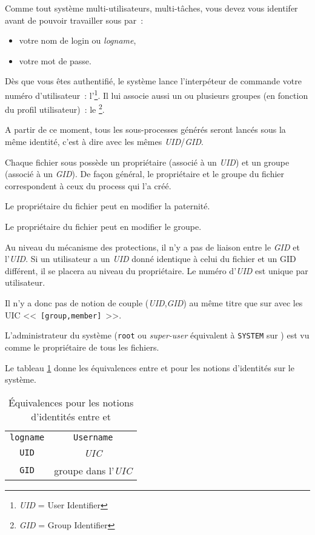 Comme tout syst{\`e}me multi-utilisateurs, multi-t{\^a}ches, vous devez vous
identifer avant de pouvoir travailler sous {\Unix} par~:
\begin{itemize}
	\item	votre nom de login ou {\sl logname},
	\item	votre mot de passe.
\end{itemize}

D{\`e}s que vous {\^e}tes authentifi{\'e}, le syst{\`e}me lance
l'interp{\'e}teur de commande votre num{\'e}ro d'utilisateur~:
l'\footnote{{\sl UID} = User Identifier}. Il lui
associe aussi un ou plusieurs groupes (en fonction du profil
utilisateur)~: le \footnote{{\sl GID} = Group Identifier}.

A partir de ce moment, tous les sous-processes g{\'e}n{\'e}r{\'e}s seront lanc{\'e}s
sous la m{\^e}me identit{\'e}, c'est {\`a} dire avec les m{\^e}mes {\sl UID}/{\sl GID}.

Chaque fichier sous {\Unix} poss{\`e}de un propri{\'e}taire (associ{\'e} {\`a} un
{\sl UID}) et un groupe (associ{\'e} {\`a} un {\sl GID}). De fa\c{c}on g{\'e}n{\'e}ral, le
propri{\'e}taire et le groupe du fichier correspondent {\`a} ceux du process qui
l'a cr{\'e}{\'e}.

Le propri{\'e}taire du fichier peut en modifier la paternit{\'e}.

Le propri{\'e}taire du fichier peut en modifier le groupe.

Au niveau du m{\'e}canisme des protections, il n'y a pas de liaison entre le
{\sl GID} et l'{\sl UID}. Si un utilisateur a un {\sl UID} donn{\'e}
identique {\`a} celui du fichier et un GID diff{\'e}rent, il se placera au
niveau du propri{\'e}taire. Le num{\'e}ro d'{\sl UID} est unique par
utilisateur.

Il n'y a donc pas de notion de couple ({\sl UID},{\sl GID}) au m{\^e}me
titre que sur {\OpenVMS} avec les UIC <<~{\tt [group,member]}~>>.

L'administrateur du syst{\`e}me ({\tt root} ou {\sl super-user} {\'e}quivalent {\`a}
{\tt SYSTEM} sur {\OpenVMS}) est vu comme le propri{\'e}taire de tous les
fichiers.

Le tableau \ref{tab-cmds-equiv-root} donne les {\'e}quivalences entre {\Unix}
et {\OpenVMS} pour les notions d'identit{\'e}s sur le syst{\`e}me.

\begin{table}[hbtp]
\centering
\begin{tabular}{|c|c|}
	\hline
		{\Unix}			&	{\OpenVMS}				\\
	\hline \hline
		{\tt logname}	&	{\tt Username}			\\
	\hline
		{\tt UID}		&	{\sl UIC}				\\
	\hline
		{\tt GID}		&	groupe dans l'{\sl UIC}	\\
	\hline
\end{tabular}
\caption{\label{tab-cmds-equiv-root}\'{E}quivalences pour les notions d'identit{\'e}s
entre {\Unix} et {\OpenVMS}}
\end{table}

